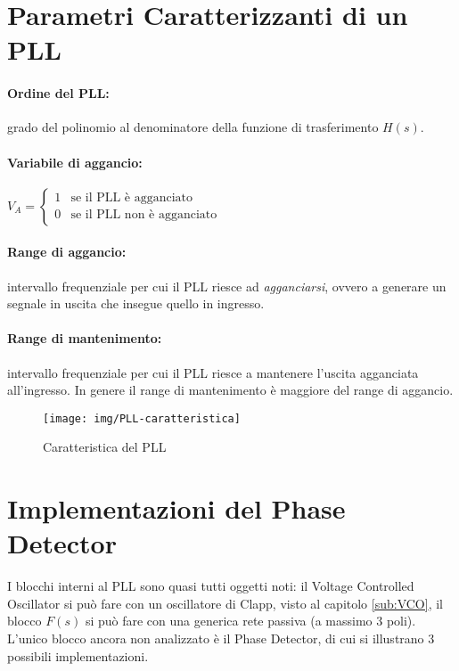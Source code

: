 \section{Parametri Caratterizzanti di un PLL}
\paragraph{Ordine del PLL:} grado del polinomio al denominatore della funzione di trasferimento $H(s)$.

\paragraph{Variabile di aggancio:} $V_A = \begin{cases}
1 & \mbox{se il PLL è agganciato}\\
0 & \mbox{se il PLL non è agganciato}
\end{cases}$

\paragraph{Range di aggancio:} intervallo frequenziale per cui il PLL riesce ad \textit{agganciarsi}, ovvero a generare un segnale in uscita che insegue quello in ingresso.
\paragraph{Range di mantenimento:} intervallo frequenziale per cui il PLL riesce a mantenere l'uscita agganciata all'ingresso. In genere il range di mantenimento è maggiore del range di aggancio.

\begin{figure}[thb]
	\centering
	\texttt{[image: img/PLL-caratteristica]}
	\caption{Caratteristica del PLL}
	\label{fig:caratteristica del PLL}
\end{figure}


\section{Implementazioni del Phase Detector}
I blocchi interni al PLL sono quasi tutti oggetti noti: il Voltage Controlled Oscillator si può fare con un oscillatore di Clapp, visto al capitolo \ref{sub:VCO}, il blocco $F(s)$ si può fare con una generica rete passiva (a massimo 3 poli).\\
L'unico blocco ancora non analizzato è il Phase Detector, di cui si illustrano 3 possibili implementazioni.


